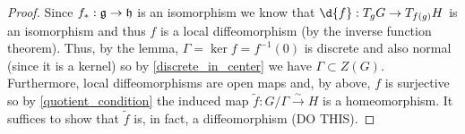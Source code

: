 \documentclass[12pt]{article}
\theoremstyle{remark}
\theoremstyle{definition}
\begin{document}
\begin{proof}
Since $f_* : \mathfrak{g} \to \mathfrak{h}$ is an isomorphism we know that $\d{f} : T_g G \to T_{f(g)} H$ is an isomorphism and thus $f$ is a local diffeomorphism (by the inverse function theorem). Thus, by the lemma, $\Gamma = \ker{f} = f^{-1}(0)$ is discrete and also normal (since it is a kernel) so by \ref{discrete_in_center} we have $\Gamma \subset Z(G)$. Furthermore, local diffeomorphisms are open maps and, by above, $f$ is surjective so by \ref{quotient_condition} the induced map $\tilde{f} : G / \Gamma \xrightarrow{\sim} H$ is a homeomorphism. It suffices to show that $\tilde{f}$ is, in fact, a diffeomorphism (DO THIS).
\end{proof}
\end{document}
